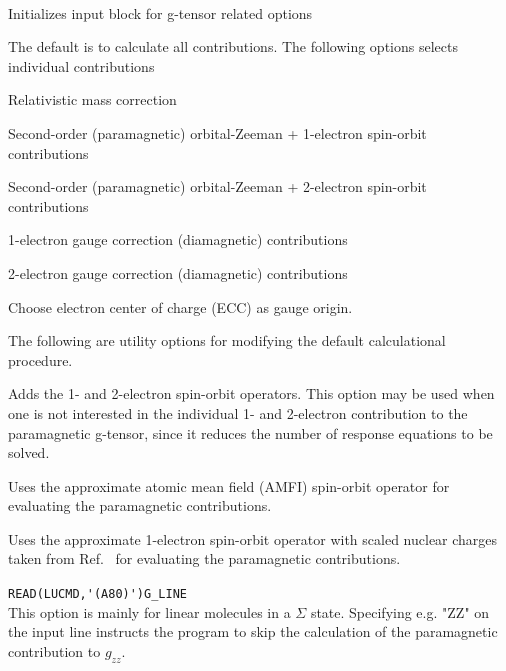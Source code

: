 \begin{description}
  \item{} \\
   Initializes input block for g-tensor related options
\end{description}
The default is to calculate all contributions. The following
options selects individual contributions
\begin{description}
   \item{}
   Relativistic mass correction
   \item{}
   Second-order (paramagnetic) orbital-Zeeman + 1-electron spin-orbit contributions
   \item{}
   Second-order (paramagnetic) orbital-Zeeman + 2-electron spin-orbit contributions
   \item{}
   1-electron gauge correction (diamagnetic) contributions
   \item{}
   2-electron gauge correction (diamagnetic) contributions
   \item{}
   Choose electron center of charge (ECC) as gauge origin.
\end{description}
The following are utility options for modifying the default calculational
procedure.
\begin{description}
  \item{}
  Adds the 1- and 2-electron spin-orbit operators. This
  option may be used when one is not interested in the individual
  1- and 2-electron contribution to the paramagnetic g-tensor,
  since it reduces the number of response equations to be solved.
   \item{}
   Uses the approximate atomic mean field (AMFI) spin-orbit operator
   for evaluating the paramagnetic contributions.
   \item{}
   Uses the approximate 1-electron spin-orbit operator with scaled nuclear
   charges taken from Ref.~\cite{skmwsmsgjpca102} for evaluating the paramagnetic contributions.
  \item{}
  \verb|READ(LUCMD,'(A80)')G_LINE |\\
  This option is mainly for linear molecules in a $\Sigma$ state.
  Specifying e.g. "ZZ" on the input line instructs the program
  to skip the calculation of the paramagnetic contribution to $g_{zz}$.
\end{description}


